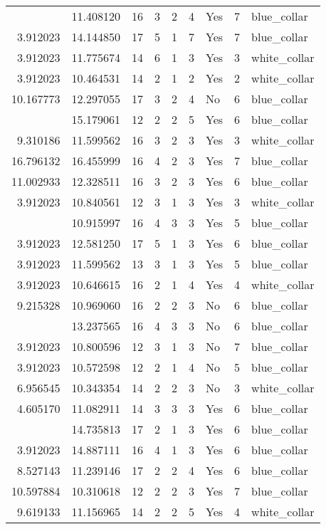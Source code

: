 \documentclass[
]{article}
\begin{document}
\begin{longtable}[t]{rrrrrllrl}
\addlinespace
11.813400 & 11.408120 & 16 & 3 & 2 & 4 & Yes & 7 & blue\_collar\\
3.912023 & 14.144850 & 17 & 5 & 1 & 7 & Yes & 7 & blue\_collar\\
3.912023 & 11.775674 & 14 & 6 & 1 & 3 & Yes & 3 & white\_collar\\
3.912023 & 10.464531 & 14 & 2 & 1 & 2 & Yes & 2 & white\_collar\\
10.167773 & 12.297055 & 17 & 3 & 2 & 4 & No & 6 & blue\_collar\\
\addlinespace
11.523371 & 15.179061 & 12 & 2 & 2 & 5 & Yes & 6 & blue\_collar\\
9.310186 & 11.599562 & 16 & 3 & 2 & 3 & Yes & 3 & white\_collar\\
16.796132 & 16.455999 & 16 & 4 & 2 & 3 & Yes & 7 & blue\_collar\\
11.002933 & 12.328511 & 16 & 3 & 2 & 3 & Yes & 6 & blue\_collar\\
3.912023 & 10.840561 & 12 & 3 & 1 & 3 & Yes & 3 & white\_collar\\
\addlinespace
7.625595 & 10.915997 & 16 & 4 & 3 & 3 & Yes & 5 & blue\_collar\\
3.912023 & 12.581250 & 17 & 5 & 1 & 3 & Yes & 6 & blue\_collar\\
3.912023 & 11.599562 & 13 & 3 & 1 & 3 & Yes & 5 & blue\_collar\\
3.912023 & 10.646615 & 16 & 2 & 1 & 4 & Yes & 4 & white\_collar\\
9.215328 & 10.969060 & 16 & 2 & 2 & 3 & No & 6 & blue\_collar\\
\addlinespace
10.693081 & 13.237565 & 16 & 4 & 3 & 3 & No & 6 & blue\_collar\\
3.912023 & 10.800596 & 12 & 3 & 1 & 3 & No & 7 & blue\_collar\\
3.912023 & 10.572598 & 12 & 2 & 1 & 4 & No & 5 & blue\_collar\\
6.956545 & 10.343354 & 14 & 2 & 2 & 3 & No & 3 & white\_collar\\
4.605170 & 11.082911 & 14 & 3 & 3 & 3 & Yes & 6 & blue\_collar\\
\addlinespace
3.912023 & 14.735813 & 17 & 2 & 1 & 3 & Yes & 6 & blue\_collar\\
3.912023 & 14.887111 & 16 & 4 & 1 & 3 & Yes & 6 & blue\_collar\\
8.527143 & 11.239146 & 17 & 2 & 2 & 4 & Yes & 6 & blue\_collar\\
10.597884 & 10.310618 & 12 & 2 & 2 & 3 & Yes & 7 & blue\_collar\\
9.619133 & 11.156965 & 14 & 2 & 2 & 5 & Yes & 4 & white\_collar\\

\end{longtable}
\end{document}
